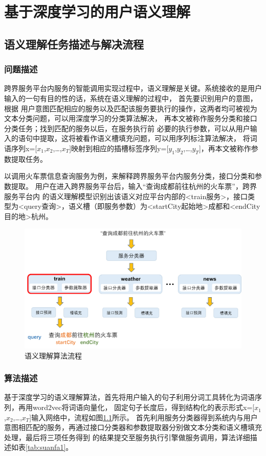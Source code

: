 \chapter{基于深度学习的用户语义理解}

\section{语义理解任务描述与解决流程}
\subsection{问题描述}
跨界服务平台内服务的智能调用实现过程中，语义理解是关键。系统接收的是用户输入的一句有目的性的话，系统在语义理解的过程中，
首先要识别用户的意图，根据
用户意图匹配相应的服务以及匹配该服务要执行的操作，这两者均可被视为文本分类问题，可以用深度学习的分类算法解决，
再本文被称作服务分类和接口分类任务；找到匹配的服务以后，在服务执行前
必要的执行参数，可以从用户输入的语句中提取，这将被看作语义槽填充问题，可以用序列标注算法解决，
将词语序列x=[$x_{1}$,$x_{2}$,\dots,$x_{T}$]映射到相应的插槽标签序列y=[$y_{1}$,$y_{2}$,\dots,$y_{T}$]，再本文被称作参数提取任务。

以调用火车票信息查询服务为例，来解释跨界服务平台内服务分类，接口分类和参数提取。
用户在进入跨界服务平台后，输入“查询成都前往杭州的火车票”，跨界服务平台内
的语义理解模型识别出该语义对应平台内部的<train服务>，接口类型为<query查询>，语义槽（即服务参数）为<startCity起始地>成都和<endCity目的地>杭州。


\begin{figure}[htbp]
    \centering
    \includegraphics[scale=0.5]{./images/liucheng.png}
    \caption{语义理解算法流程}
    \label{fig:questiondesc}
  \end{figure}

\subsection{算法描述}
基于深度学习的语义理解算法，首先将用户输入的句子利用分词工具转化为词语序列，再用word2vec将词语向量化，
固定句子长度后，得到结构化的表示形式x=[$x_{1}$,$x_{2}$,\dots,$x_{T}$]输入网络中，流程如图\ref{fig:questiondesc}所示。
首先利用服务分类器得到系统内与用户意图相匹配的服务，再通过接口分类器和参数提取器分别做文本分类和语义槽填充处理，最后将三项任务得到
的结果提交至服务执行引擎做服务调用，算法详细描述如表\ref{tab:suanfa1}。

